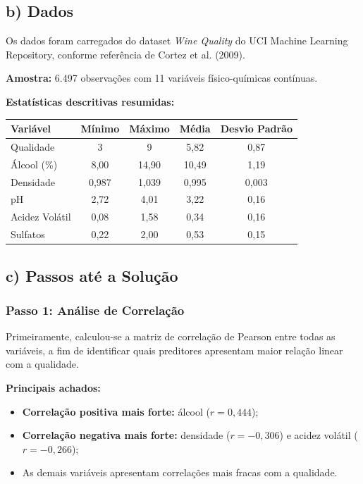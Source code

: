 \documentclass[12pt,a4paper]{article}
\begin{document}
\subsection*{b) Dados}

Os dados foram carregados do dataset \textit{Wine Quality} do UCI Machine Learning Repository, conforme referência de Cortez et al. (2009).

\textbf{Amostra:} 6.497 observações com 11 variáveis físico-químicas contínuas.

\textbf{Estatísticas descritivas resumidas:}

\begin{center}
\begin{tabular}{|l|c|c|c|c|}
\hline
\textbf{Variável} & \textbf{Mínimo} & \textbf{Máximo} & \textbf{Média} & \textbf{Desvio Padrão} \\
\hline
Qualidade & 3 & 9 & 5,82 & 0,87 \\
Álcool (\%) & 8,00 & 14,90 & 10,49 & 1,19 \\
Densidade & 0,987 & 1,039 & 0,995 & 0,003 \\
pH & 2,72 & 4,01 & 3,22 & 0,16 \\
Acidez Volátil & 0,08 & 1,58 & 0,34 & 0,16 \\
Sulfatos & 0,22 & 2,00 & 0,53 & 0,15 \\
\hline
\end{tabular}
\end{center}

\subsection*{c) Passos até a Solução}

\subsubsection*{Passo 1: Análise de Correlação}

Primeiramente, calculou-se a matriz de correlação de Pearson entre todas as variáveis, a fim de identificar quais preditores apresentam maior relação linear com a qualidade.

\textbf{Principais achados:}

\begin{itemize}
  \item \textbf{Correlação positiva mais forte:} álcool ($r = 0,444$);
  \item \textbf{Correlação negativa mais forte:} densidade ($r = -0,306$) e acidez volátil ($r = -0,266$);
  \item As demais variáveis apresentam correlações mais fracas com a qualidade.
\end{itemize}
\end{document}
